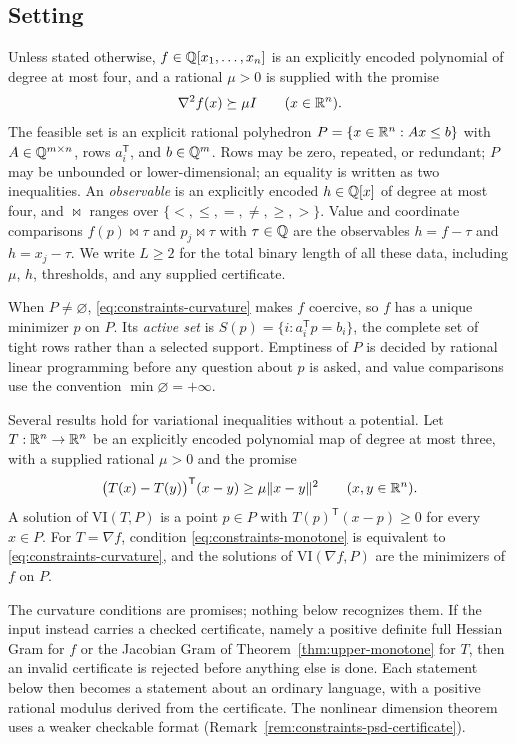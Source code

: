 \subsection{Setting}
\label{sec:constraints-setting}

Unless stated otherwise, $f\in\mathbb Q[x_1,\ldots,x_n]$ is an explicitly encoded
polynomial of degree at most four, and a rational $\mu>0$ is supplied with the
promise
\begin{equation}\label{eq:constraints-curvature}
 \nabla^2 f(x)\succeq\mu I\qquad(x\in\mathbb R^n).
\end{equation}
The feasible set is an explicit rational polyhedron
$P=\{x\in\mathbb R^n:Ax\le b\}$ with $A\in\mathbb Q^{m\times n}$, rows $a_i^{\mathsf T}$,
and $b\in\mathbb Q^m$. Rows may be zero, repeated, or redundant; $P$ may be unbounded
or lower-dimensional; an equality is written as two inequalities. An
\emph{observable} is an explicitly encoded $h\in\mathbb Q[x]$ of degree at most four,
and ${\bowtie}$ ranges over $\{<,\le,=,\ne,\ge,>\}$. Value and coordinate
comparisons $f(p)\bowtie\tau$ and $p_j\bowtie\tau$ with $\tau\in\mathbb Q$ are the
observables $h=f-\tau$ and $h=x_j-\tau$. We write $L\ge2$ for the total binary
length of all these data, including $\mu$, $h$, thresholds, and any supplied
certificate.

When $P\ne\varnothing$, \eqref{eq:constraints-curvature} makes $f$ coercive,
so $f$ has a unique minimizer $p$ on $P$. Its \emph{active set} is
$S(p)=\{i:a_i^{\mathsf T}p=b_i\}$, the complete set of tight rows rather than
a selected support. Emptiness of $P$ is decided by rational linear programming
before any question about $p$ is asked, and value comparisons use the
convention $\min\varnothing=+\infty$.

Several results hold for variational inequalities without a potential. Let
$T:\mathbb R^n\to\mathbb R^n$ be an explicitly encoded polynomial map of degree at most
three, with a supplied rational $\mu>0$ and the promise
\begin{equation}\label{eq:constraints-monotone}
 \bigl(T(x)-T(y)\bigr)^{\mathsf T}(x-y)\ge\mu\|x-y\|^2
 \qquad(x,y\in\mathbb R^n).
\end{equation}
A solution of $\mathrm{VI}(T,P)$ is a point $p\in P$ with
$T(p)^{\mathsf T}(x-p)\ge0$ for every $x\in P$. For $T=\nabla f$, condition
\eqref{eq:constraints-monotone} is equivalent to
\eqref{eq:constraints-curvature}, and the solutions of $\mathrm{VI}(\nabla f,P)$
are the minimizers of $f$ on $P$.

The curvature conditions are promises; nothing below recognizes them. If the
input instead carries a checked certificate, namely a positive definite full
Hessian Gram for $f$ or the Jacobian Gram of Theorem~\ref{thm:upper-monotone}
for $T$, then an invalid certificate is rejected before anything else is done.
Each statement below then becomes a statement about an ordinary language, with
a positive rational modulus derived from the certificate. The nonlinear
dimension theorem uses a weaker checkable format
(Remark~\ref{rem:constraints-psd-certificate}).

